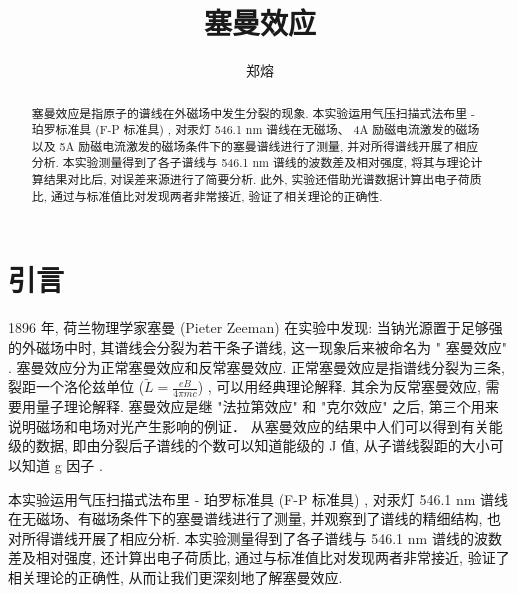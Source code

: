 \documentclass[font=default]{mpltx}
\makeatletter
\newcommand{\note}[1]{{\color{gray}#1}}
\newcommand*\file[1]{\textbf{\texttt{#1}}}
\newcommand\releasedate{%
    \href{https://github.com/CastleStar14654/PKUMpLtX/releases/tag/\mpltx@fileversion}%
        {\mpltx@filedate, \mpltx@fileversion}}
\makeatother
\begin{document}
\title{塞曼效应} %
\author{郑熔} %
\date{}
\begin{abstract}
  塞曼效应是指原子的谱线在外磁场中发生分裂的现象. 
  本实验运用气压扫描式法布里 - 珀罗标准具 (F-P 标准具) , 
  对汞灯 546.1 nm 谱线在无磁场、 4A 励磁电流激发的磁场以及 5A 励磁电流激发的磁场条件下的塞曼谱线进行了测量, 
  并对所得谱线开展了相应分析.
  本实验测量得到了各子谱线与 546.1 nm 谱线的波数差及相对强度,
  将其与理论计算结果对比后,
  对误差来源进行了简要分析.
  此外, 实验还借助光谱数据计算出电子荷质比, 通过与标准值比对发现两者非常接近, 验证了相关理论的正确性.
\end{abstract}

\maketitle

\section{引言}
  1896 年, 荷兰物理学家塞曼 (Pieter Zeeman) 在实验中发现: 
  当钠光源置于足够强的外磁场中时, 其谱线会分裂为若干条子谱线, 
  这一现象后来被命名为  " 塞曼效应" . 塞曼效应分为正常塞曼效应和反常塞曼效应.
  正常塞曼效应是指谱线分裂为三条, 
  裂距一个洛伦兹单位 ($\tilde{L} = \frac{eB}{4\pi mc}$) , 可以用经典理论解释.
  其余为反常塞曼效应, 需要用量子理论解释.
  塞曼效应是继 "法拉第效应" 和 "克尔效应" 之后, 第三个用来说明磁场和电场对光产生影响的例证．
  从塞曼效应的结果中人们可以得到有关能级的数据, 即由分裂后子谱线的个数可以知道能级的 J 值, 从子谱线裂距的大小可以知道 g 因子 .
  \par
  本实验运用气压扫描式法布里 - 珀罗标准具 (F-P 标准具) , 
  对汞灯 546.1 nm 谱线在无磁场、有磁场条件下的塞曼谱线进行了测量, 
  并观察到了谱线的精细结构, 也对所得谱线开展了相应分析.
  本实验测量得到了各子谱线与 546.1 nm 谱线的波数差及相对强度,
  还计算出电子荷质比, 通过与标准值比对发现两者非常接近, 验证了相关理论的正确性, 从而让我们更深刻地了解塞曼效应.
\end{document}
